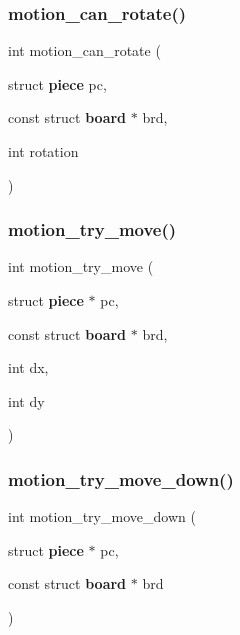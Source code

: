 \mbox{\label{motion_8h_afd171d9e0c9f0884598c492d7d3ed8e9}} 
\subsubsection{motion\+\_\+can\+\_\+rotate()}
{\footnotesize\ttfamily int motion\+\_\+can\+\_\+rotate (\begin{DoxyParamCaption}\item[{struct \textbf{ piece}}]{pc,  }\item[{const struct \textbf{ board} $\ast$}]{brd,  }\item[{int}]{rotation }\end{DoxyParamCaption})}

\mbox{\label{motion_8h_a29682f9162cac571bd205e47492c5ab8}} 
\subsubsection{motion\+\_\+try\+\_\+move()}
{\footnotesize\ttfamily int motion\+\_\+try\+\_\+move (\begin{DoxyParamCaption}\item[{struct \textbf{ piece} $\ast$}]{pc,  }\item[{const struct \textbf{ board} $\ast$}]{brd,  }\item[{int}]{dx,  }\item[{int}]{dy }\end{DoxyParamCaption})}

\mbox{\label{motion_8h_a416d5d5b14ef78b17dd4f892627556ac}} 
\subsubsection{motion\+\_\+try\+\_\+move\+\_\+down()}
{\footnotesize\ttfamily int motion\+\_\+try\+\_\+move\+\_\+down (\begin{DoxyParamCaption}\item[{struct \textbf{ piece} $\ast$}]{pc,  }\item[{const struct \textbf{ board} $\ast$}]{brd }\end{DoxyParamCaption})}

